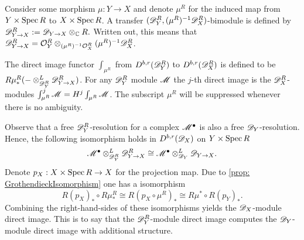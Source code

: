     Consider some morphism $\mu:Y\to X$ and denote $\mu^R$ for the induced map from $Y\times \operatorname{Spec} R$ to $X\times \operatorname{Spec} R$.
    A transfer $(\mathscr{D}_Y^R,(\mu^R)^{-1}\mathscr{D}_X^R)$-bimodule is defined by $\mathscr{D}_{Y\to X}^R:= \mathscr{D}_{Y\to X}\otimes_{\mathbb{C}} R .$ Written out, this means that $\mathscr{D}_{Y\to X}^R = \mathcal{O}_Y^R \otimes_{(\mu^R)^{-1}\mathcal{O}_X^R}(\mu^R)^{-1}\mathscr{D}_X^R$.
    \begin{definition}
      The direct image functor $\int_{\mu^R}$ from $D^{b,r}(\mathscr{D}_Y^R)$ to $D^{b,r}(\mathscr{D}_X^R)$ is defined to be $R\mu^R_* ({-}\otimes_{\mathscr{D}_Y^R}^L \mathscr{D}_{Y\to X}^R)$.
      For any $\mathscr{D}_Y^R$ module $\mathscr{M}$ the $j$-th direct image is the $\mathscr{D}_X^R$-modules $\int^j_{\mu^R} \mathscr{M} = H^j \int_{\mu^R} \mathscr{M}$.
      The subscript $\mu^R$ will be suppressed whenever there is no ambiguity.
    \end{definition}
    Observe that a free $\mathscr{D}_Y^R$-resolution for a complex $\mathscr{M}^\bullet$ is also a free $\mathscr{D}_Y$-resolution.
    Hence, the following isomorphism holds in $D^{b,r}(\mathscr{D}_X)$ on $Y\times \operatorname{Spec} R$
    $$\mathscr{M}^\bullet \otimes_{\mathscr{D}_Y^R}^L \mathscr{D}_{Y\to X}^R \cong \mathscr{M}^\bullet \otimes_{\mathscr{D}_Y}^L \mathscr{D}_{Y\to X}.$$
    Denote $p_X:X\times \operatorname{Spec} R \to X$ for the projection map.
    Due to \cref{prop: GrothendieckIsomorphism} one has a isomorphism
    $$R(p_X)_* \circ R\mu^R_* \cong R(p_X \circ \mu^R)_* \cong R\mu^* \circ R(p_Y)_*.$$
    Combining the right-hand-sides of these isomorphisms yields the $\mathscr{D}_X$-module direct image.
    This is to say that the $\mathscr{D}_Y^R$-module direct image computes the $\mathscr{D}_Y$-module direct image with additional structure.

